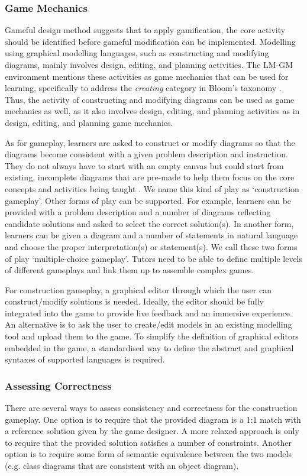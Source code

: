 \documentclass[10pt, a4paper]{report} \usepackage[titletoc]{appendix}
\begin{document}
\subsubsection{Game Mechanics} 
\label{Game Mechanics} 
Gameful design method \cite{deterding2015lens} suggests that to apply gamification, the core activity should be identified before gameful modification can be implemented. Modelling using graphical modelling languages, such as constructing and modifying diagrams, mainly involves design, editing, and planning activities. The LM-GM environment \cite{arnab2015mapping} mentions these activities as game mechanics that can be used for learning, specifically to address the \emph{creating} category in Bloom's taxonomy \cite{krathwohl2002revision}. Thus, the activity of constructing and modifying diagrams can be used as game mechanics as well, as it also involves design, editing, and planning activities as in design, editing, and planning game mechanics.

As for gameplay, learners are asked to construct or modify diagrams so that the diagrams become consistent with a given problem description and instruction. They do not always have to start with an empty canvas but could start from existing, incomplete diagrams that are pre-made to help them focus on the core concepts and activities being taught \cite{deterding2015lens}. We name this kind of play as `construction gameplay'. Other forms of play can be supported. For example, learners can be provided with a problem description and a number of diagrams reflecting candidate solutions and asked to select the correct solution(s). In another form, learners can be given a diagram and a number of statements in natural language and choose the proper interpretation(s) or statement(s). We call these two forms of play `multiple-choice gameplay'. Tutors need to be able to define multiple levels of different gameplays and link them up to assemble complex games. 

For construction gameplay, a graphical editor through which the user can construct/modify solutions is needed. Ideally, the editor should be fully integrated into the game to provide live feedback and an immersive experience. An alternative is to ask the user to create/edit models in an existing modelling tool and upload them to the game. To simplify the definition of graphical editors embedded in the game, a standardised way to define the abstract and graphical syntaxes of supported languages is required. 

\subsubsection{Assessing Correctness} 
\label{Assessing Correctness} 
There are several ways to assess consistency and correctness for the construction gameplay. One option is to require that the provided diagram is a 1:1 match with a reference solution given by the game designer. A more relaxed approach is only to require that the provided solution satisfies a number of constraints. Another option is to require some form of semantic equivalence between the two models (e.g. class diagrams that are consistent with an object diagram). 
\end{document}
